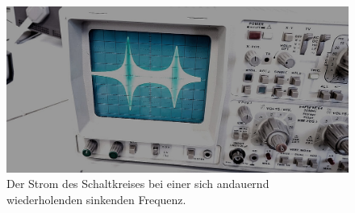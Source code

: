     \begin{figure}
        \centering
        \includegraphics[scale=0.09]{content/Bilder/Titelbild.jpg}
        \caption{Der Strom des Schaltkreises bei einer sich andauernd wiederholenden sinkenden Frequenz.}
        \label{fig:Abb4}
        \end{figure}
\label{sec:Durchfuehrung}

